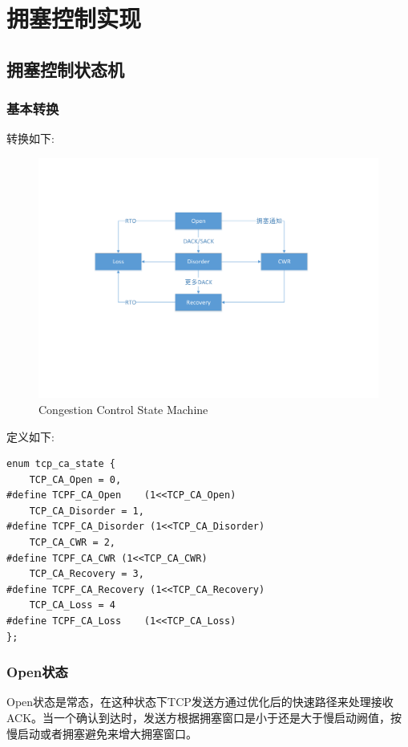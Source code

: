 \section{拥塞控制实现}

    \subsection{拥塞控制状态机}
        \subsubsection{基本转换}
        转换如下:
            \begin{figure}[htb]        
                \centering
                \includegraphics[width=\textwidth]{images/Congestion_Control_State_Machine.pdf}
                \caption{Congestion Control State Machine}
                \label{Congestion Control State Machine}
            \end{figure} 
    
        定义如下:
\begin{verbatim}
enum tcp_ca_state {
    TCP_CA_Open = 0,
#define TCPF_CA_Open    (1<<TCP_CA_Open)
    TCP_CA_Disorder = 1,
#define TCPF_CA_Disorder (1<<TCP_CA_Disorder)
    TCP_CA_CWR = 2,
#define TCPF_CA_CWR (1<<TCP_CA_CWR)
    TCP_CA_Recovery = 3,
#define TCPF_CA_Recovery (1<<TCP_CA_Recovery)
    TCP_CA_Loss = 4
#define TCPF_CA_Loss    (1<<TCP_CA_Loss)
};
\end{verbatim}
        \subsubsection{Open状态}
            Open状态是常态，在这种状态下TCP发送方通过优化后的快速路径来处理接收ACK。当一个确认到达时，发送方根据拥塞窗口是小于还是大于慢启动阙值，按慢启动或者拥塞避免来增大拥塞窗口。

